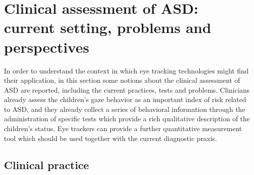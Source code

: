 \section{Clinical assessment of ASD: current setting, problems and perspectives}
\label{sec:clinicalassessment}

In order to understand the context in which eye tracking technologies might find their application, in this section some notions about the clinical assessment of ASD are reported, including the current practices, tests and problems. Clinicians already assess the children’s gaze behavior as an important index of risk related to ASD, and they already collect a series of behavioral information through the administration of specific tests which provide a rich qualitative description of the children’s status. Eye trackers can provide a further quantitative measurement tool which should be used together with the current diagnostic praxis.


\subsection{Clinical practice}
\label{sec:clinicalpraxis}


